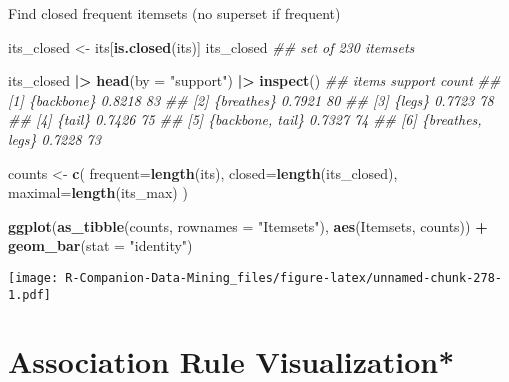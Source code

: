 \documentclass[
  notitlepage]{book}
\newenvironment{Shaded}{\begin{snugshade}}{\end{snugshade}}
\newcommand{\CommentTok}[1]{\textcolor[rgb]{0.56,0.35,0.01}{\textit{#1}}}
\newcommand{\DataTypeTok}[1]{\textcolor[rgb]{0.13,0.29,0.53}{#1}}
\newcommand{\ErrorTok}[1]{\textcolor[rgb]{0.64,0.00,0.00}{\textbf{#1}}}
\newcommand{\KeywordTok}[1]{\textcolor[rgb]{0.13,0.29,0.53}{\textbf{#1}}}
\newcommand{\NormalTok}[1]{#1}
\newcommand{\OperatorTok}[1]{\textcolor[rgb]{0.81,0.36,0.00}{\textbf{#1}}}
\newcommand{\StringTok}[1]{\textcolor[rgb]{0.31,0.60,0.02}{#1}}
\begin{document}
Find closed frequent itemsets (no superset if frequent)

\begin{Shaded}
\begin{Highlighting}[]
\NormalTok{its\_closed \textless{}{-}}\StringTok{ }\NormalTok{its[}\KeywordTok{is.closed}\NormalTok{(its)]}
\NormalTok{its\_closed}
\CommentTok{\#\# set of 230 itemsets}
\end{Highlighting}
\end{Shaded}

\begin{Shaded}
\begin{Highlighting}[]
\NormalTok{its\_closed }\OperatorTok{|}\ErrorTok{\textgreater{}}\StringTok{ }\KeywordTok{head}\NormalTok{(}\DataTypeTok{by =} \StringTok{"support"}\NormalTok{) }\OperatorTok{|}\ErrorTok{\textgreater{}}\StringTok{ }\KeywordTok{inspect}\NormalTok{()}
\CommentTok{\#\#     items            support count}
\CommentTok{\#\# [1] \{backbone\}       0.8218  83   }
\CommentTok{\#\# [2] \{breathes\}       0.7921  80   }
\CommentTok{\#\# [3] \{legs\}           0.7723  78   }
\CommentTok{\#\# [4] \{tail\}           0.7426  75   }
\CommentTok{\#\# [5] \{backbone, tail\} 0.7327  74   }
\CommentTok{\#\# [6] \{breathes, legs\} 0.7228  73}
\end{Highlighting}
\end{Shaded}

\begin{Shaded}
\begin{Highlighting}[]
\NormalTok{counts \textless{}{-}}\StringTok{ }\KeywordTok{c}\NormalTok{(}
  \DataTypeTok{frequent=}\KeywordTok{length}\NormalTok{(its),}
  \DataTypeTok{closed=}\KeywordTok{length}\NormalTok{(its\_closed),}
  \DataTypeTok{maximal=}\KeywordTok{length}\NormalTok{(its\_max)}
\NormalTok{)}

\KeywordTok{ggplot}\NormalTok{(}\KeywordTok{as\_tibble}\NormalTok{(counts, }\DataTypeTok{rownames =} \StringTok{"Itemsets"}\NormalTok{),}
  \KeywordTok{aes}\NormalTok{(Itemsets, counts)) }\OperatorTok{+}\StringTok{ }\KeywordTok{geom\_bar}\NormalTok{(}\DataTypeTok{stat =} \StringTok{"identity"}\NormalTok{)}
\end{Highlighting}
\end{Shaded}

\texttt{[image: R-Companion-Data-Mining\_files/figure-latex/unnamed-chunk-278-1.pdf]}

\hypertarget{association-rule-visualization}{%
\section{Association Rule Visualization*}\label{association-rule-visualization}}
\end{document}
